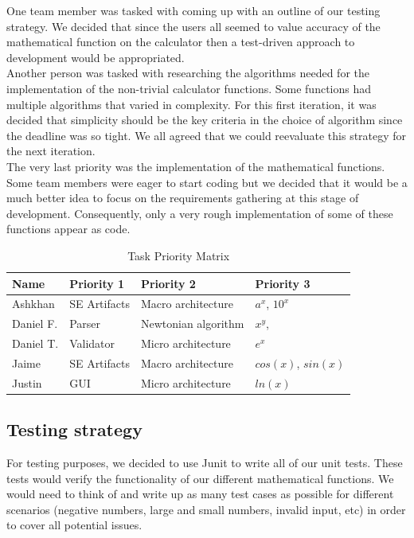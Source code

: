 \documentclass[a4paper, 12pt]{article}
\begin{document}
One team member was tasked with coming up with an outline of our testing strategy. We decided that since the users all seemed to value accuracy of the mathematical function on the calculator then a test-driven approach to development would be appropriated. \\

Another person was tasked with researching the algorithms needed for the implementation of the non-trivial calculator functions. Some functions had multiple algorithms that varied in complexity. For this first iteration, it was decided that simplicity should be the key criteria in the choice of algorithm since the deadline was so tight. We all agreed that we could reevaluate this strategy for the next iteration. \\

The very last priority was the implementation of the mathematical functions. Some team members were eager to start coding but we decided that it would be a much better idea to focus on the requirements gathering at this stage of development. Consequently, only a very rough implementation of some of these functions appear as code. \\

\begin{table}[ht]
\centering
\caption{Task Priority Matrix}
\begin{tabular}{|l|l|l|l|}
\hline
\textbf{Name}&\textbf{Priority 1}  &\textbf{Priority 2}  &\textbf{Priority 3}  \\ \hline
 Ashkhan&SE Artifacts  &Macro architecture  &$a^x$, $10^x$  \\ \hline
 Daniel F.&Parser  &Newtonian algorithm  &$x^y$,   \\ \hline
 Daniel T.&Validator  &Micro architecture  &$e^x$  \\ \hline
 Jaime&SE Artifacts  &Macro architecture  &$cos(x)$, $sin(x)$  \\ \hline
 Justin&GUI  &Micro architecture  &$ln(x)$  \\ \hline
\end{tabular}
\end{table}

\subsection{Testing strategy}

For testing purposes, we decided to use Junit to write all of our unit tests. These tests would verify the functionality of our different mathematical functions. We would need to think of and write up as many test cases as possible for different scenarios (negative numbers, large and small numbers, invalid input, etc) in order to cover all potential issues. \\
\end{document}
